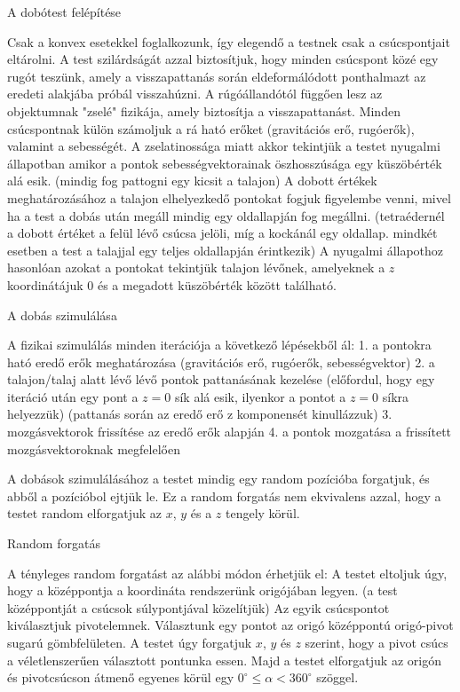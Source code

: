 



A dobótest felépítése

Csak a konvex esetekkel foglalkozunk, így elegendő a testnek csak a csúcspontjait eltárolni.
A test szilárdságát azzal biztosítjuk, hogy minden csúcspont közé egy rugót teszünk, amely a visszapattanás során eldeformálódott ponthalmazt az eredeti alakjába próbál visszahúzni.
A rúgóállandótól függően lesz az objektumnak "zselé" fizikája, amely biztosítja a visszapattanást.
Minden csúcspontnak külön számoljuk a rá ható erőket (gravitációs erő, rugóerők), valamint a sebességét.
A zselatinossága miatt akkor tekintjük a testet nyugalmi állapotban amikor a pontok sebességvektorainak öszhosszúsága egy küszöbérték alá esik. (mindig fog pattogni egy kicsit a talajon)
A dobott értékek meghatározásához a talajon elhelyezkedő pontokat fogjuk figyelembe venni, mivel ha a test a dobás után megáll mindig egy oldallapján fog megállni. (tetraédernél a dobott értéket a felül lévő csúcsa jelöli, míg a kockánál egy oldallap. mindkét esetben a test a talajjal egy teljes oldallapján érintkezik)
A nyugalmi állapothoz hasonlóan azokat a pontokat tekintjük talajon lévőnek, amelyeknek a $z$ koordinátájuk $0$ és a megadott küszöbérték között található.


A dobás szimulálása

A fizikai szimulálás minden iterációja a következő lépésekből ál:
1. a pontokra ható eredő erők meghatározása
(gravitációs erő, rugóerők, sebességvektor)
2. a talajon/talaj alatt lévő lévő pontok pattanásának kezelése
(előfordul, hogy egy iteráció után egy pont a $z=0$ sík alá esik, ilyenkor a pontot a $z=0$ síkra helyezzük)
(pattanás során az eredő erő z komponensét kinullázzuk)
3. mozgásvektorok frissítése az eredő erők alapján
4. a pontok mozgatása a frissített mozgásvektoroknak megfelelően

A dobások szimulálásához a testet mindig egy random pozícióba forgatjuk, és abből a pozícióbol ejtjük le.
Ez a random forgatás nem ekvivalens azzal, hogy a testet random elforgatjuk az $x$, $y$ és a $z$ tengely körül.


Random forgatás

A tényleges random forgatást az alábbi módon érhetjük el:
A testet eltoljuk úgy, hogy a középpontja a koordináta rendszerünk origójában legyen. (a test középpontját a csúcsok súlypontjával közelítjük)
Az egyik csúcspontot kiválasztjuk pivotelemnek.
Választunk egy pontot az origó középpontú origó-pivot sugarú gömbfelületen.
A testet úgy forgatjuk $x$, $y$ és $z$ szerint, hogy a pivot csúcs a véletlenszerűen választott pontunka essen.
Majd a testet elforgatjuk az origón és pivotcsúcson átmenő egyenes körül egy $0^\circ \leq \alpha < 360^\circ$ szöggel.

